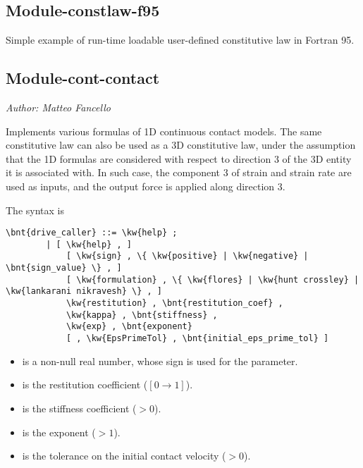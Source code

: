 \subsection{Module-constlaw-f95}
Simple example of run-time loadable user-defined constitutive law in Fortran 95.

\subsection{Module-cont-contact}
\emph{Author: Matteo Fancello}

\noindent
Implements various formulas of 1D continuous contact models.
The same constitutive law can also be used as a 3D constitutive law,
under the assumption that the 1D formulas are considered with respect
to direction 3 of the 3D entity it is associated with.
In such case, the component 3 of strain and strain rate are used as inputs,
and the output force is applied along direction 3.

The syntax is
\begin{Verbatim}[commandchars=\\\{\}]
    \bnt{drive_caller} ::= \kw{help} ;
        | [ \kw{help} , ]
            [ \kw{sign} , \{ \kw{positive} | \kw{negative} | \bnt{sign_value} \} , ]
            [ \kw{formulation} , \{ \kw{flores} | \kw{hunt crossley} | \kw{lankarani nikravesh} \} , ]
            \kw{restitution} , \bnt{restitution_coef} ,
            \kw{kappa} , \bnt{stiffness} ,
            \kw{exp} , \bnt{exponent}
            [ , \kw{EpsPrimeTol} , \bnt{initial_eps_prime_tol} ]
\end{Verbatim}
\begin{itemize}
\item {} is a non-null real number, whose sign is used for the  parameter.
\item {} is the restitution coefficient ($[0 \to 1]$).
\item {} is the stiffness coefficient ($ > 0$).
\item {} is the exponent ($ > 1$).
\item {} is the tolerance on the initial contact velocity ($ > 0$).
\end{itemize}

